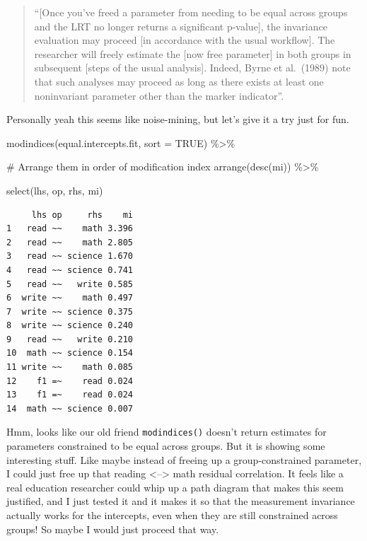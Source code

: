 \documentclass[
  letterpaper,
  DIV=11,
  numbers=noendperiod]{scrreprt}
\newenvironment{Shaded}{\begin{snugshade}}{\end{snugshade}}
\newcommand{\AttributeTok}[1]{\textcolor[rgb]{0.40,0.45,0.13}{#1}}
\newcommand{\CommentTok}[1]{\textcolor[rgb]{0.37,0.37,0.37}{#1}}
\newcommand{\ConstantTok}[1]{\textcolor[rgb]{0.56,0.35,0.01}{#1}}
\newcommand{\FunctionTok}[1]{\textcolor[rgb]{0.28,0.35,0.67}{#1}}
\newcommand{\NormalTok}[1]{\textcolor[rgb]{0.00,0.23,0.31}{#1}}
\newcommand{\SpecialCharTok}[1]{\textcolor[rgb]{0.37,0.37,0.37}{#1}}
\begin{document}
\begin{quote}
``{[}Once you've freed a parameter from needing to be equal across
groups and the LRT no longer returns a significant p-value{]}, the
invariance evaluation may proceed {[}in accordance with the usual
workflow{]}. The researcher will freely estimate the {[}now free
parameter{]} in both groups in subsequent {[}steps of the usual
analysis{]}. Indeed, Byrne et al.~(1989) note that such analyses may
proceed as long as there exists at least one noninvariant parameter
other than the marker indicator''.
\end{quote}

Personally yeah this seems like noise-mining, but let's give it a try
just for fun.

\begin{Shaded}
\begin{Highlighting}[]
\FunctionTok{modindices}\NormalTok{(equal.intercepts.fit, }\AttributeTok{sort =} \ConstantTok{TRUE}\NormalTok{) }\SpecialCharTok{\%\textgreater{}\%} 
  
  \CommentTok{\# Arrange them in order of modification index}
  \FunctionTok{arrange}\NormalTok{(}\FunctionTok{desc}\NormalTok{(mi)) }\SpecialCharTok{\%\textgreater{}\%} 
  
  \FunctionTok{select}\NormalTok{(lhs, op, rhs, mi)}
\end{Highlighting}
\end{Shaded}

\begin{verbatim}
     lhs op     rhs    mi
1   read ~~    math 3.396
2   read ~~    math 2.805
3   read ~~ science 1.670
4   read ~~ science 0.741
5   read ~~   write 0.585
6  write ~~    math 0.497
7  write ~~ science 0.375
8  write ~~ science 0.240
9   read ~~   write 0.210
10  math ~~ science 0.154
11 write ~~    math 0.085
12    f1 =~    read 0.024
13    f1 =~    read 0.024
14  math ~~ science 0.007
\end{verbatim}

Hmm, looks like our old friend \texttt{modindices()} doesn't return
estimates for parameters constrained to be equal across groups. But it
is showing some interesting stuff. Like maybe instead of freeing up a
group-constrained parameter, I could just free up that reading
\textless--\textgreater{} math residual correlation. It feels like a
real education researcher could whip up a path diagram that makes this
seem justified, and I just tested it and it makes it so that the
measurement invariance actually works for the intercepts, even when they
are still constrained across groups! So maybe I would just proceed that
way.
\end{document}
